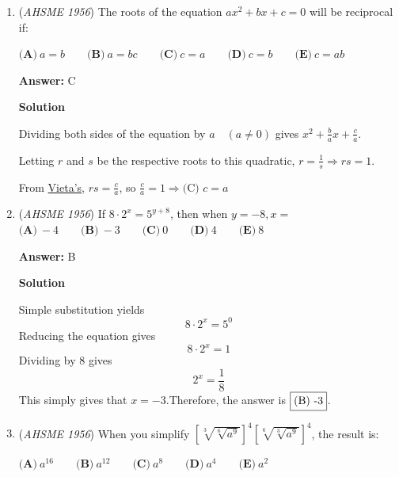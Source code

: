 \begin{enumerate}
 $\textbf{(A)}\ 5 \qquad\textbf{(B)}\ 7 \qquad\textbf{(C)}\ 10 \qquad\textbf{(D)}\ 12 \qquad\textbf{(E)}\ 14$

 \textbf{Answer: }B



\textbf{Solution 1}

Let there be $x$ cows and $y$ chickens. Then, there are $4x+2y$ legs and $x+y$ heads. Writing the equation:
 \[4x+2y=14+2(x+y)\] 
 \[4x+2y=14+2x+2y\] 
 \[2x=14\] 
 \[x=\boxed{\textbf{(B) }7}\]



	\item (\textit{AHSME 1956}) The roots of the equation $ax^2 + bx + c = 0$ will be reciprocal if: 


 $\textbf{(A)}\ a = b \qquad\textbf{(B)}\ a = bc \qquad\textbf{(C)}\ c = a \qquad\textbf{(D)}\ c = b \qquad\textbf{(E)}\ c = ab$

 \textbf{Answer: }C



\textbf{Solution}

Dividing both sides of the equation by $a\quad(a\neq0)$ gives $x^2+\frac{b}{a}x+\frac{c}{a}$. 

 Letting $r$ and $s$ be the respective roots to this quadratic, $r=\frac{1}{s} \Rightarrow rs=1$.

 From \href{https://artofproblemsolving.com/wiki/index.php?title=Vieta\%27s}{Vieta's}, $rs=\frac{c}{a}$, so $\frac{c}{a}=1\Rightarrow\boxed{\text{(C) }c=a}$



	\item (\textit{AHSME 1956}) If $8\cdot2^x = 5^{y + 8}$, then when $y = - 8,x =$
$\textbf{(A)}\ - 4 \qquad\textbf{(B)}\ - 3 \qquad\textbf{(C)}\ 0 \qquad\textbf{(D)}\ 4 \qquad\textbf{(E)}\ 8$

 \textbf{Answer: }B



\textbf{Solution}

Simple substitution yields
 \[8 \cdot 2^{x} = 5^{0}\]Reducing the equation gives
 \[8 \cdot 2^{x} = 1\]Dividing by 8 gives
 \[2^{x}=\frac{1}{8}\]This simply gives that $x=-3$.Therefore, the answer is $\fbox{(B) -3}$.

 


	\item (\textit{AHSME 1956}) When you simplify $\left[ \sqrt [3]{\sqrt [6]{a^9}} \right]^4\left[ \sqrt [6]{\sqrt [3]{a^9}} \right]^4$, the result is: 


 $\textbf{(A)}\ a^{16} \qquad\textbf{(B)}\ a^{12} \qquad\textbf{(C)}\ a^8 \qquad\textbf{(D)}\ a^4 \qquad\textbf{(E)}\ a^2$


\end{enumerate}
